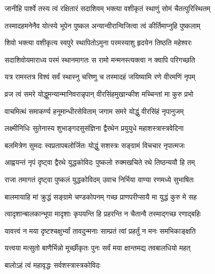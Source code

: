 \twolineshloka
{जानीहि पार्श्वे तस्य त्वं रक्षितारं सदाशिवम्}
{भक्त्या वशीकृतं स्थाणुं सोमं चैतत्पुरिस्थितम्}%

\twolineshloka
{तस्मादहमनेनैव योत्स्ये भूपेन पुष्कल}
{अन्यान्वीरान्विजित्वा त्वं कीर्तिमाप्नुहि पुष्कलाम्}%


\twolineshloka
{शिवो भक्त्या वशीकृत्य स्वपुरे स्थापितोऽमुना}
{परमस्याशु हृदयेन तिष्ठति महेश्वरः}%

\twolineshloka
{सदाशिवोयमाराध्य परमं स्थानमागतः}
{स रामो मन्मनस्त्यक्त्वा न क्वापि परिगच्छति}%

\twolineshloka
{यत्र रामस्तत्र विश्वं सर्वं स्थास्नु चरिष्णु च}
{तस्मादहं जयिष्यामि रणे वीरमणिं नृपम्}%

\twolineshloka
{व्रज त्वं समरे योद्धुमन्यान्मानिवरान्नृपान्}
{वीरसिंहमुखान्कीश मच्चिन्तां मा कुरु प्रभो}%

\twolineshloka
{वाचमित्थं समाकर्ण्य हनूमान्धीरसेविताम्}
{जगाम समरे योद्धुं वीरसिंहं नृपानुजम्}%

\twolineshloka
{लक्ष्मीनिधिः सुतेनास्य शुभाङ्गदसुसंज्ञिना}
{द्वैरथेन प्रयुयुधे महाशस्त्रास्त्रवेदिना}%

\twolineshloka
{बलमित्रेण सुमदः स्वप्रतापबलोर्जितः}
{योद्धुं सशस्त्रः सङ्ग्रामं विचचार नृपात्मजः}%

\twolineshloka
{आह्वयन्तं नृपं दृष्ट्वा द्वैरथे युद्धकोविदः}
{पुष्कलो रुक्मखचिते रथे तिष्ठन्ययौ हि तम्}%

\twolineshloka
{राजा तमागतं दृष्ट्वा पुष्कलं युद्धकोविदम्}
{उवाच निर्भिया वाण्या रणमध्ये सुभाषितः}%


\twolineshloka
{बालमायाहि मां क्रुद्धं सङ्ग्रामे चण्डकोपनम्}
{गच्छ प्राणपरीप्सायै मा युद्धं कुरु मे सह}%

\twolineshloka
{त्वादृशान्बालकान्भूपा मादृशाः कृपयन्ति हि}
{प्रहरन्ति न चैतान्वै तस्माद्गच्छ रणाद्बहिः}%

\twolineshloka
{यावत्त्वं न मया दृष्टश्चक्षुर्भ्यां तावदुन्मनाः}
{साम्प्रतं त्वां प्रहर्तुं न मनः समभिकाङ्क्षति}%

\twolineshloka
{यत्त्वया मत्सुतो बाणैर्भिन्नो मूर्च्छीकृतः पुनः}
{सर्वं मया क्षान्तमद्य तवबालधियो महत्}%



\onelineshloka
{बालोऽहं त्वं महावृद्धः सर्वशस्त्रास्त्रकोविदः}%

